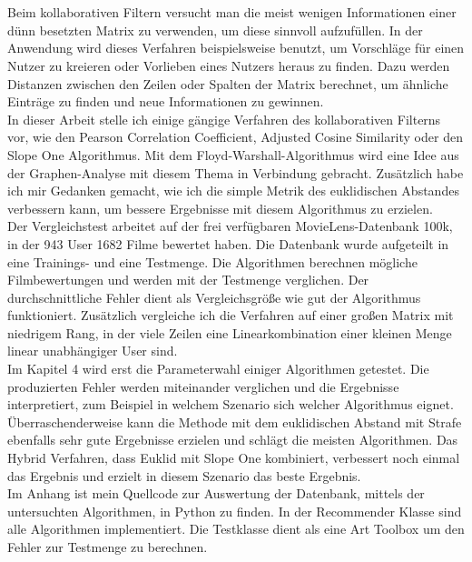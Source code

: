 \section*{}
Beim kollaborativen Filtern versucht man die meist wenigen Informationen einer dünn besetzten Matrix zu verwenden, um diese sinnvoll aufzufüllen. In der Anwendung wird dieses Verfahren beispielsweise benutzt, um Vorschläge für einen Nutzer zu kreieren oder Vorlieben eines Nutzers heraus zu finden. Dazu werden Distanzen zwischen den Zeilen oder Spalten der Matrix berechnet, um ähnliche Einträge zu finden und neue Informationen zu gewinnen.\\
In dieser Arbeit stelle ich einige gängige Verfahren des kollaborativen Filterns vor, wie den Pearson Correlation Coefficient, Adjusted Cosine Similarity oder den Slope One Algorithmus. Mit dem Floyd-Warshall-Algorithmus wird eine Idee aus der Graphen-Analyse mit diesem Thema in Verbindung gebracht. Zusätzlich habe ich mir Gedanken gemacht, wie ich die simple Metrik des euklidischen Abstandes verbessern kann, um bessere Ergebnisse mit diesem Algorithmus zu erzielen.\\
Der Vergleichstest arbeitet auf der frei verfügbaren MovieLens-Datenbank 100k, in der 943 User 1682 Filme bewertet haben. Die Datenbank wurde aufgeteilt in eine Trainings- und eine Testmenge. Die Algorithmen berechnen mögliche Filmbewertungen und werden mit der Testmenge verglichen. Der durchschnittliche Fehler dient als Vergleichsgröße wie gut der Algorithmus funktioniert. Zusätzlich vergleiche ich die Verfahren auf einer großen Matrix mit niedrigem Rang, in der viele Zeilen eine Linearkombination einer kleinen Menge linear unabhängiger User sind.\\
Im Kapitel 4 wird erst die Parameterwahl einiger Algorithmen getestet. Die produzierten Fehler werden miteinander verglichen und die Ergebnisse interpretiert, zum Beispiel in welchem Szenario sich welcher Algorithmus eignet. Überraschenderweise kann die Methode mit dem euklidischen Abstand mit Strafe ebenfalls sehr gute Ergebnisse erzielen und schlägt die meisten Algorithmen. Das Hybrid Verfahren, dass Euklid mit Slope One kombiniert, verbessert noch einmal das Ergebnis und erzielt in diesem Szenario das beste Ergebnis.\\
Im Anhang ist mein Quellcode zur Auswertung der Datenbank, mittels der untersuchten Algorithmen, in Python zu finden. In der Recommender Klasse sind alle Algorithmen implementiert. Die Testklasse dient als eine Art Toolbox um den Fehler zur Testmenge zu berechnen.
